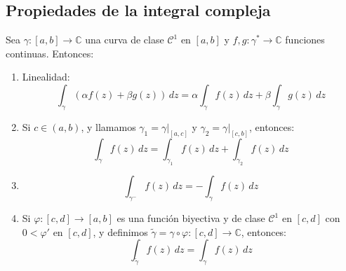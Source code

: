 \ejemplo{

    \[
        \int_{[2i,2]} z^2 \, dz
    \]
    \[
        \gamma : [0, 1] \to \mathbb{C}, \quad \gamma(t) = (1-t)2i + t2 = 2t + 2i(1-t)
    \]
    \[
        \gamma'(t) = 2 - 2i
    \]
    \[
        \int_{[2i,2]} z^2 \, dz = 
        \int_0^1 (\gamma(t))^2 \gamma'(t) \, dt =
        \int_0^1 (2t + 2i(1-t))^2 (2 - 2i) \, dt =
    \]
    \[
        = (2-2i) \int_{0}^1 [(2-2i)^2t^2-4+4i(2-2i)t] \, dt =
        (2-2i) \left[ (2-2i)^2 \frac{1}{0}t^2-4\int_{0}^{1} dt + 4i(2-2i) \frac{1}{2}t \right] = ... = \frac{8}{3}(1+i)
    \]

}

\subsection{Propiedades de la integral compleja}

\begin{proposición} 
    Sea $\gamma: [a, b] \to \mathbb{C}$ una curva de clase $\mathcal{C}^1$ en $[a, b]$ y $f, g: \gamma^* \to \mathbb{C}$ funciones continuas. Entonces:
    \begin{enumerate}
        \item Linealidad:
        \[  
        \int_\gamma (\alpha f(z) + \beta g(z)) \, dz =
        \alpha \int_\gamma f(z) \, dz + \beta \int_\gamma g(z) \, dz
        \]
        \item Si $c \in (a, b)$, y llamamos $\gamma_1 = \gamma|_{[a, c]}$ y $\gamma_2 = \gamma|_{[c, b]}$, entonces:
        \[
        \int_\gamma f(z) \, dz = \int_{\gamma_1} f(z) \, dz + \int_{\gamma_2} f(z) \, dz
        \]
        \item \[
            \int_{\gamma^-} f(z) \, dz = - \int_\gamma f(z) \, dz
        \]
        \item Si $\varphi: [c, d] \to [a, b]$ es una función biyectiva y de clase $\mathcal{C}^1$ en $[c, d]$ con $0 < \varphi'$ en $[c, d]$, y definimos $\tilde{\gamma} = \gamma \circ \varphi: [c, d] \to \mathbb{C}$, entonces:
        \[
        \int_{\tilde{\gamma}} f(z) \, dz = \int_\gamma f(z) \, dz
        \]
    \end{enumerate}
\end{proposición}

